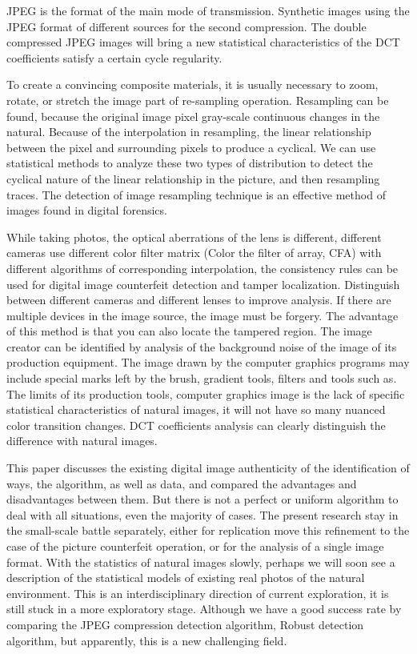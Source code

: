 \documentclass[a4paper, 10pt, notitlepage]{report}
\begin{document}
	JPEG is the format of the main mode of transmission. Synthetic images using the JPEG format of different sources for the second compression. The double compressed JPEG images will bring a new statistical characteristics of the DCT coefficients satisfy a certain cycle regularity. 

	To create a convincing composite materials, it is usually necessary to zoom, rotate, or stretch the image part of re-sampling operation. Resampling can be found, because the original image pixel gray-scale continuous changes in the natural. Because of the interpolation in resampling, the linear relationship between the pixel and surrounding pixels to produce a cyclical. We can use statistical methods to analyze these two types of distribution to detect the cyclical nature of the linear relationship in the picture, and then resampling traces. The detection of image resampling technique is an effective method of images found in digital forensics.

	While taking photos, the optical aberrations of the lens is different, different cameras use different color filter matrix (Color the filter of array, CFA) with different algorithms of corresponding interpolation, the consistency rules can be used for digital image counterfeit detection and tamper localization. Distinguish between different cameras and different lenses to improve analysis. If there are multiple devices in the image source, the image must be forgery. The advantage of this method is that you can also locate the tampered region. The image creator can be identified by analysis of the background noise of the image of its production equipment. The image drawn by the computer graphics programs may include special marks left by the brush, gradient tools, filters and tools such as. The limits of its production tools, computer graphics image is the lack of specific statistical characteristics of natural images, it will not have so many nuanced color transition changes. DCT coefficients analysis can clearly distinguish the difference with natural images.

	This paper discusses the existing digital image authenticity of the identification of ways, the algorithm, as well as data, and compared the advantages and disadvantages between them. But there is not a perfect or uniform algorithm to deal with all situations, even the majority of cases. The present research stay in the small-scale battle separately, either for replication move this refinement to the case of the picture counterfeit operation, or for the analysis of a single image format. With the statistics of natural images slowly, perhaps we will soon see a description of the statistical models of existing real photos of the natural environment. This is an interdisciplinary direction of current exploration, it is still stuck in a more exploratory stage. Although we have a good success rate by comparing the JPEG compression detection algorithm, Robust detection algorithm, but apparently, this is a new challenging field. 
\end{document}
